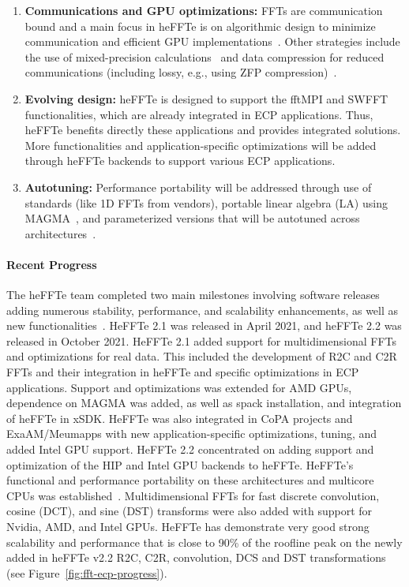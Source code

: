 \begin{enumerate}
\item
\textbf{Communications and GPU optimizations:}
FFTs are communication bound and a main focus in heFFTe is on algorithmic
design to minimize communication and efficient GPU 
implementations~\cite{sc19,eurompi19,heffte-pact21,hpec21}.
Other strategies include the use of mixed-precision calculations~\cite{Haidar2018,tcfft18}
and data compression for reduced communications (including lossy, e.g., using ZFP 
compression)~\cite{Anztetal2020}.
\item
\textbf{Evolving design:}
heFFTe is designed to support the fftMPI and SWFFT functionalities,
which are already integrated in ECP applications. Thus, heFFTe benefits
directly these applications and provides integrated solutions. 
More functionalities and application-specific optimizations will be added 
through heFFTe backends to support various ECP applications. 
\item
\textbf{Autotuning:}
Performance portability will be addressed through use of standards (like 1D FFTs 
from vendors), portable linear algebra (LA) using MAGMA~\cite{Tomov_2010_pcsa}, 
and parameterized versions that will be autotuned across architectures~\cite{Nath2010,Kurzak2012gemmfermi}.
\end{enumerate}

\paragraph{Recent Progress}
The heFFTe team completed two main milestones involving software releases adding 
numerous stability, performance, and scalability enhancements, as well as new 
functionalities~\cite{heffte-pact21}. 
HeFFTe 2.1 was released in April 2021, and heFFTe 2.2 was released in October 
2021. HeFFTe 2.1 added support for multidimensional FFTs and optimizations for real data.
This included the development of R2C and C2R FFTs and their integration in heFFTe and 
specific optimizations in ECP applications. Support and optimizations was extended for AMD 
GPUs, dependence on MAGMA was added, as well as spack installation, and integration of heFFTe in xSDK.
HeFFTe was also integrated in CoPA projects and ExaAM/Meumapps with new application-specific 
optimizations, tuning, and added Intel GPU support. 
HeFFTe 2.2 concentrated on adding support and optimization of the HIP and Intel GPU backends to 
heFFTe. HeFFTe's functional and performance portability on these architectures and
multicore CPUs was established~\cite{hpec21}.
Multidimensional FFTs for 
fast discrete convolution, cosine (DCT), and sine (DST) transforms were also added with support 
for Nvidia, AMD, 
and Intel GPUs. HeFFTe has demonstrate very good strong scalability and performance that is 
close to 90\% of the roofline peak on the newly added in heFFTe v2.2 R2C, C2R, convolution,
DCS and DST transformations~\cite{heffte-pact21,heffte-iccs20} (see Figure~\ref{fig:fft-ecp-progress}). 


